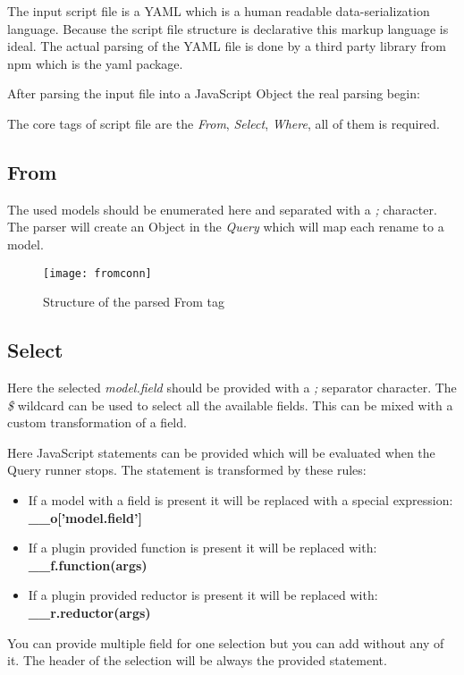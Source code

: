 The input script file is a YAML\cite{yaml} which is a human readable data-serialization language. Because the script file structure is declarative
this markup language is ideal. The actual parsing of the YAML file is done by
a third party library from npm which is the yaml\cite{yaml-pck} package.

After parsing the input file into a JavaScript Object the real parsing begin: 

The core tags of script file are the \textit{From}, \textit{Select}, \textit{Where}, all of them is required.
\newpage
\subsection{From}
The used models should be enumerated here and separated with a \textit{;} character. The parser will create an Object in the \textit{Query} which will map each rename to a model.

 \begin{figure}[H]
 	\centering
 	\texttt{[image: fromconn]}
 	\caption{Structure of the parsed From tag}
 	\label{fig:fig-help}
 \end{figure}

\subsection{Select}
Here the selected \textit{model.field} should be provided with a \textit{;} 
separator character. The \textit{\$} wildcard can be used to select all the
available fields. This can be mixed with a custom transformation of a field.

Here JavaScript statements can be provided which will be evaluated when the
Query runner stops. The statement is transformed by these rules:

\begin{itemize}
	\item If a model with a field is present it will be replaced with a special expression: \textbf{\_\_o['model.field']}
	\item If a plugin provided function is present it will be replaced with: \textbf{\_\_f.function(args)}
	\item If a plugin provided reductor is present it will be replaced with: \textbf{\_\_r.reductor(args)}
\end{itemize}

You can provide multiple field for one selection but you can add without any of it. The header of the selection
will be always the provided statement.

